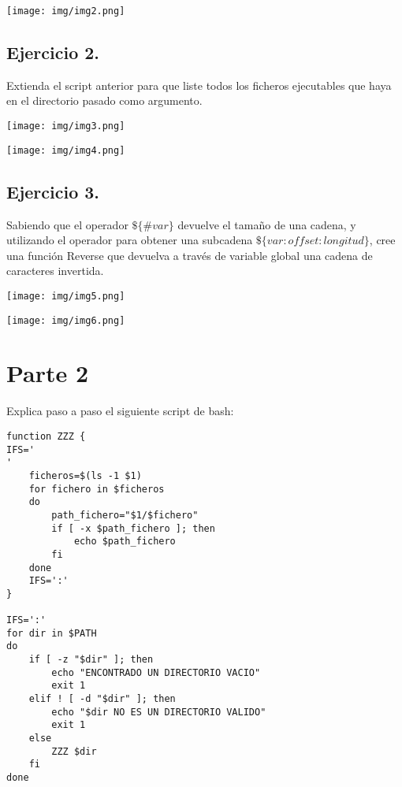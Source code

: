 \documentclass{article}
\begin{document}
\begin{center}
\texttt{[image: img/img2.png]} 
\end{center}

\subsection{Ejercicio 2.}
Extienda el script anterior para que liste todos los ficheros
ejecutables que haya en el directorio pasado como argumento.

\begin{center}
\texttt{[image: img/img3.png]} 
\end{center}
\begin{center}
\texttt{[image: img/img4.png]} 
\end{center}

\subsection{Ejercicio 3.}
Sabiendo que el operador $\$\{\#var\}$ devuelve el tamaño de una
cadena, y utilizando el operador para obtener una subcadena
$\$\{var:offset:longitud\}$, cree una función Reverse que devuelva a través de
variable global una cadena de caracteres invertida. 

\begin{center}
\texttt{[image: img/img5.png]} 
\end{center}
\begin{center}
\texttt{[image: img/img6.png]} 
\end{center}

\newpage


\section{Parte 2}
Explica paso a paso el siguiente script de bash:

\lstset{language=C, breaklines=true, basicstyle=\footnotesize}
\begin{lstlisting}[frame=single]
function ZZZ {
IFS='
'
	ficheros=$(ls -1 $1)
	for fichero in $ficheros
	do
		path_fichero="$1/$fichero"
		if [ -x $path_fichero ]; then
			echo $path_fichero
		fi
	done
	IFS=':'
}

IFS=':'
for dir in $PATH
do
	if [ -z "$dir" ]; then
		echo "ENCONTRADO UN DIRECTORIO VACIO"
		exit 1
	elif ! [ -d "$dir" ]; then
		echo "$dir NO ES UN DIRECTORIO VALIDO"
		exit 1
	else
		ZZZ $dir
	fi
done
\end{lstlisting}
\end{document}
